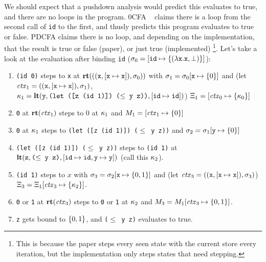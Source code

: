 We should expect that a pushdown analysis would predict this evaluates to true, and there are no loops in the program.
%
0CFA ~\citep{ianjohnson:Shivers:1991:CFA} claims there is a loop from the second call of \texttt{id} to the first, and thusly predicts this program evaluates to true or false.
%
PDCFA claims there is no loop, and depending on the implementation, that the result is true or false (paper), or just true (implemented)
\footnote{This is because the paper steps every seen state with the current store every iteration, but the implementation only steps states that need stepping.}.
%
Let's take a look at the evaluation after binding \texttt{id} ($\sigma_0 = [\texttt{id} \mapsto \{ (\lambda{} \texttt{x}. \texttt{x}, \bot) \}]$):

\begin{enumerate}
\item{\texttt{(id 0)} steps to \texttt{x} at $\mathbf{rt}(((\texttt{x}, [\texttt{x}\mapsto\texttt{x}]), \sigma_0))$ with $\sigma_1 =
    \sigma_0[\texttt{x} \mapsto \{ 0 \}]$ and
    (let $\mathit{ctx}_1 = ((\texttt{x},[\texttt{x}\mapsto\texttt{x}]),\sigma_1)$,
         $\kappa_1 = \mathbf{lt}(\texttt{y}, \texttt{(let ([z (id 1)]) ($\le$ y z))}, [\texttt{id}\mapsto{\texttt{id}}])$)
    $\Xi_1 = [\mathit{ctx}_0 \mapsto \{ \kappa_0 \}]$}
\item{\texttt{0} at $\mathbf{rt}(\mathit{ctx}_1)$ steps to $0$ at $\kappa_1$ and $M_1 = [\mathit{ctx}_1 \mapsto \{ 0 \}]$}
\item{\texttt{0} at $\kappa_1$ steps to \texttt{(let ([z (id 1)]) ($\le$ y z))} and $\sigma_2 = \sigma_1[\texttt{y} \mapsto \{ 0 \}]$}
\item{\texttt{(let ([z (id 1)]) ($\le$ y z))} steps to \texttt{(id 1)} at \\
      $\mathbf{lt}(\texttt{z}, \texttt{($\le$ y z)}, [\texttt{id} \mapsto \texttt{id}, \texttt{y} \mapsto \texttt{y}])$
      (call this $\kappa_2$).}
\item{\texttt{(id 1)} steps to $x$ with $\sigma_3 = \sigma_2[\texttt{x} \mapsto \{ 0,1 \}]$ and
      (let $\mathit{ctx}_3 = ((\texttt{x},[\texttt{x}\mapsto\texttt{x}]),\sigma_3)$) $\Xi_3 =\Xi_1[\mathit{ctx}_3 \mapsto \{ \kappa_2 \}]$.}
\item{\texttt{0} or \texttt{1} at $\mathbf{rt}(\mathit{ctx}_3)$ steps to \texttt{0} or \texttt{1} at $\kappa_2$ and $M_3 = M_1[\mathit{ctx}_3 \mapsto \{ 0,1 \}]$.}
\item{\texttt{z} gets bound to $\{ 0,1 \}$, and \texttt{($\le$ y z)} evaluates to true.}
\end{enumerate}

